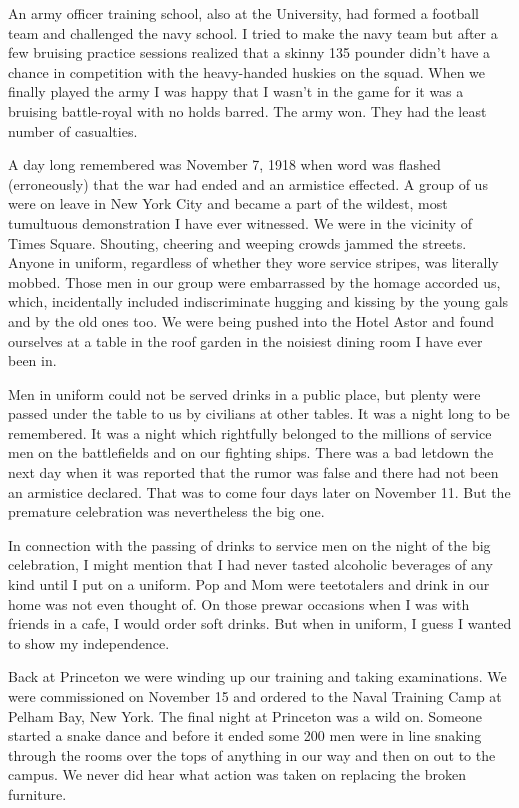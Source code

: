 \documentclass[12pt]{book}              %
\begin{document}
An army officer training school, also at the University, had formed a football team and challenged the navy school. I tried to make the navy team but after a few bruising practice sessions realized that a skinny 135 pounder didn't have a chance in competition with the heavy-handed huskies on the squad. When we finally played the army I was happy that I wasn't in the game for it was a bruising battle-royal with no holds barred. The army won. They had the least number of casualties. 

A day long remembered was November 7, 1918 when word was flashed (erroneously) that the war had ended and an armistice effected. A group of us were on leave in New York City and became a part of the wildest, most tumultuous demonstration I have ever witnessed. We were in the vicinity of Times Square. Shouting, cheering and weeping crowds jammed the streets. Anyone in uniform, regardless of whether they wore service stripes, was literally mobbed. Those men in our group were embarrassed by the homage accorded us, which, incidentally included indiscriminate hugging and kissing by the young gals and by the old ones too. We were being pushed into the Hotel Astor and found ourselves at a table in the roof garden in the noisiest dining room I have ever been in.

Men in uniform could not be served drinks in a public place, but plenty were passed under the table to us by civilians at other tables. It was a night long to be remembered. It was a night which rightfully belonged to the millions of service men on the battlefields and on our fighting ships. There was a bad letdown the next day when it was reported that the rumor was false and there had not been an armistice declared. That was to come four days later on November 11. But the premature celebration was nevertheless the big one. 

In connection with the passing of drinks to service men on the night of the big celebration, I might mention that I had never tasted alcoholic beverages of any kind until I put on a uniform. Pop and Mom were teetotalers and drink in our home was not even thought of. On those prewar occasions when I was with friends in a cafe, I would order soft drinks. But when in uniform, I guess I wanted to show my independence. 

Back at Princeton we were winding up our training and taking examinations. We were commissioned on November 15 and ordered to the Naval Training Camp at Pelham Bay, New York. The final night at Princeton was a wild on. Someone started a snake dance and before it ended some 200 men were in line snaking through the rooms over the tops of anything in our way and then on out to the campus. We never did hear what action was taken on replacing the broken furniture. 
\end{document}
